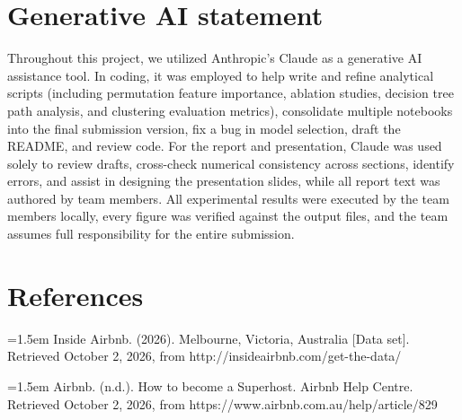 \documentclass[final,1p,11pt]{elsarticle}
\renewcommand\_{\textunderscore\allowbreak}%
\begin{document}
\section*{Generative AI statement}
Throughout this project, we utilized Anthropic's Claude as a generative AI assistance tool. In coding, it was employed to help write and refine analytical scripts (including permutation feature importance, ablation studies, decision tree path analysis, and clustering evaluation metrics), consolidate multiple notebooks into the final submission version, fix a bug in model selection, draft the README, and review code. For the report and presentation, Claude was used solely to review drafts, cross-check numerical consistency across sections, identify errors, and assist in designing the presentation slides, while all report text was authored by team members. All experimental results were executed by the team members locally, every figure was verified against the output files, and the team assumes full responsibility for the entire submission.

\clearpage
\section*{References}
\begingroup\setlength{\parindent}{0pt}\setlength{\parskip}{3pt}
\hangindent=1.5em Inside Airbnb. (2026). Melbourne, Victoria, Australia [Data set]. Retrieved October 2, 2026, from http://insideairbnb.com/get-the-data/

\hangindent=1.5em Airbnb. (n.d.). How to become a Superhost. Airbnb Help Centre. Retrieved October 2, 2026, from https://www.airbnb.com.au/help/article/829
\endgroup
\end{document}
